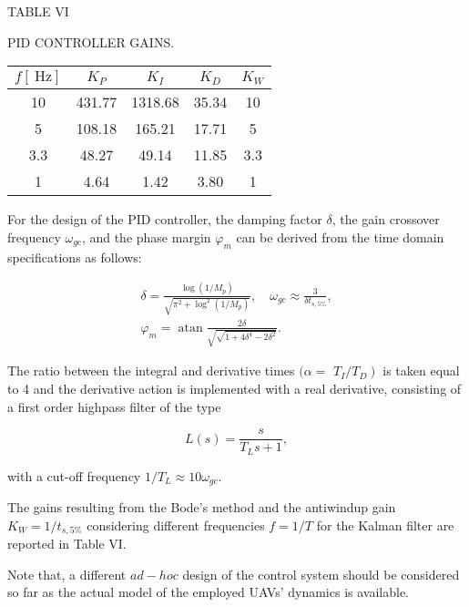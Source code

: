 \documentclass[conference]{IEEEtran}
\begin{document}
TABLE VI

PID CONTROLLER GAINS.

\begin{center}
\begin{tabular}{ccccc}
$f[\mathrm{~Hz}]$ & $K_{P}$ & $K_{I}$ & $K_{D}$ & $K_{W}$ \\
\hline
10 & 431.77 & 1318.68 & 35.34 & 10 \\
5 & 108.18 & 165.21 & 17.71 & 5 \\
3.3 & 48.27 & 49.14 & 11.85 & 3.3 \\
1 & 4.64 & 1.42 & 3.80 & 1 \\
\hline
\end{tabular}
\end{center}

For the design of the PID controller, the damping factor $\delta$, the gain crossover frequency $\omega_{g c}$, and the phase margin $\varphi_{m}$ can be derived from the time domain specifications as follows:


\begin{gather*}
\delta=\frac{\log \left(1 / M_{p}\right)}{\sqrt{\pi^{2}+\log ^{2}\left(1 / M_{p}\right)}}, \quad \omega_{g c} \approx \frac{3}{\delta t_{s, 5 \%}},  \tag{40}\\
\varphi_{m}=\operatorname{atan} \frac{2 \delta}{\sqrt{\sqrt{1+4 \delta^{4}-2 \delta^{2}}}} .
\end{gather*}


The ratio between the integral and derivative times $(\alpha=$ $\left.T_{I} / T_{D}\right)$ is taken equal to 4 and the derivative action is implemented with a real derivative, consisting of a first order highpass filter of the type


\begin{equation*}
L(s)=\frac{s}{T_{L} s+1}, \tag{41}
\end{equation*}


with a cut-off frequency $1 / T_{L} \approx 10 \omega_{g c}$.

The gains resulting from the Bode's method and the antiwindup gain $K_{W}=1 / t_{s, 5 \%}$ considering different frequencies $f=1 / T$ for the Kalman filter are reported in Table VI.

Note that, a different $a d-h o c$ design of the control system should be considered so far as the actual model of the employed UAVs' dynamics is available.
\end{document}

